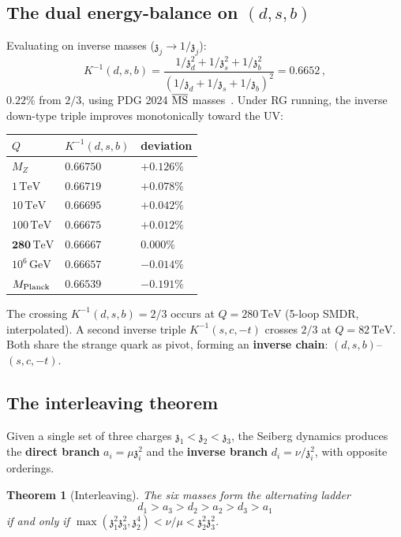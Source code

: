 \documentclass[12pt,a4paper]{article}
\newtheorem{theorem}{Theorem}
\newcommand{\GeV}{\,\mathrm{GeV}}
\newcommand{\TeV}{\,\mathrm{TeV}}
\newcommand{\zch}{\mathfrak{z}}
\begin{document}
\subsection{The dual energy-balance on $(d, s, b)$}

Evaluating on inverse masses ($\zch_j \to 1/\zch_j$):
\begin{equation}
  K^{-1}(d,s,b) = \frac{1/\zch_d^2 + 1/\zch_s^2 + 1/\zch_b^2}
  {(1/\zch_d + 1/\zch_s + 1/\zch_b)^2}
  = 0.6652\,,
\end{equation}
$0.22\%$ from $2/3$, using PDG 2024 $\overline{\rm MS}$
masses~\cite{PDG:2024}.
Under RG running, the inverse down-type triple improves
monotonically toward the UV:
\begin{center}
\begin{tabular}{lll}
\hline
$Q$ & $K^{-1}(d,s,b)$ & deviation \\
\hline
$M_Z$ & $0.66750$ & $+0.126\%$ \\
$1\TeV$ & $0.66719$ & $+0.078\%$ \\
$10\TeV$ & $0.66695$ & $+0.042\%$ \\
$100\TeV$ & $0.66675$ & $+0.012\%$ \\
$\mathbf{280\TeV}$ & $\mathbf{0.66667}$ & $\mathbf{0.000\%}$ \\
$10^6\GeV$ & $0.66657$ & $-0.014\%$ \\
$M_{\rm Planck}$ & $0.66539$ & $-0.191\%$ \\
\hline
\end{tabular}
\end{center}
The crossing $K^{-1}(d,s,b) = 2/3$ occurs at
$Q = 280\TeV$ (5-loop SMDR, interpolated).
A second inverse triple $K^{-1}(s,c,-t)$ crosses $2/3$
at $Q = 82\TeV$.
Both share the strange quark as pivot, forming an
\textbf{inverse chain}: $(d,s,b)$--$(s,c,-t)$.


\subsection{The interleaving theorem}

Given a single set of three charges $\zch_1 < \zch_2 < \zch_3$,
the Seiberg dynamics produces the \textbf{direct branch}
$a_i = \mu\zch_i^2$ and the \textbf{inverse branch}
$d_i = \nu/\zch_i^2$, with opposite orderings.

\begin{theorem}[Interleaving]
\label{thm:interleave}
The six masses form the alternating ladder
\begin{equation}
  d_1 > a_3 > d_2 > a_2 > d_3 > a_1
\end{equation}
if and only if
$\max(\zch_1^2\zch_3^2, \zch_2^4) < \nu/\mu
< \zch_2^2\zch_3^2$.
\end{theorem}
\end{document}
